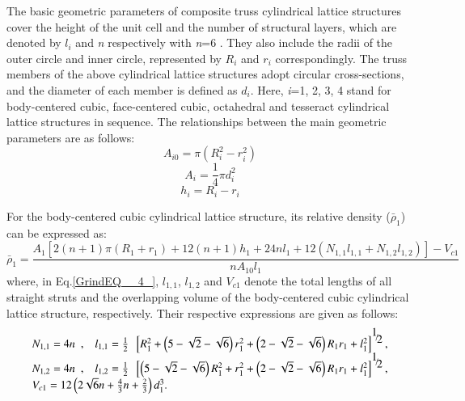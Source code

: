 \documentclass{article} %
\begin{document}
The basic geometric parameters of composite truss cylindrical lattice structures cover the height of the unit cell and the number of structural layers, which are denoted by $l_{i} $ and \textit{n} respectively with \textit{n}=6 . They also include the radii of the outer circle and inner circle, represented by $R_{i} $ and $r_{i} $ correspondingly. The truss members of the above cylindrical lattice structures adopt circular cross-sections, and the diameter of each member is defined as $d_{i} $. Here, \textit{i}=1, 2, 3, 4 stand for body-centered cubic, face-centered cubic, octahedral and tesseract cylindrical lattice structures in sequence. The relationships between the main geometric parameters are as follows:
\begin{equation} \label{GrindEQ__1_} 
A_{i0} =\pi \left(R_{i}^{2} -r_{i}^{2} \right) 
\end{equation} 
\begin{equation} \label{GrindEQ__2_} 
A_{i} =\frac{1}{4} \pi d_{i}^{2}  
\end{equation} 
\begin{equation} \label{GrindEQ__3_} 
h_{i} =R_{i} -r_{i}  
\end{equation} 

For the body-centered cubic cylindrical lattice structure, its relative density ($\bar{\rho }_{1} $) can be expressed as:
\begin{equation} \label{GrindEQ__4_} 
\bar{\rho }_{1} =\frac{A_{1} \left[2\left(n+1\right)\pi \left(R_{1} +r_{1} \right)+12\left(n+1\right)h_{1} +24nl_{1} +12\left(N_{1,1} l_{1,1} +N_{1,2} l_{1,2} \right)\right]-V_{c1} }{nA_{10} l_{1} }  
\end{equation} 
where, in Eq.\eqref{GrindEQ__4_}, $l_{1,1} $, $l_{1,2} $ and $V_{c1} $ denote the total lengths of all straight struts and the overlapping volume of the body-centered cubic cylindrical lattice structure, respectively. Their respective expressions are given as follows:
\[\begin{array}{l} {N_{1,1} =4n\begin{array}{cc} {,} & {l_{1,1} =\frac{1}{2} } \end{array}\left[R_{1}^{2} +\left(5-\sqrt{2} -\sqrt{6} \right)r_{1}^{2} +\left(2-\sqrt{2} -\sqrt{6} \right)R_{1} r_{1} +l_{1}^{2} \right]^{{\raise0.7ex\hbox{$ 1 $}\!\mathord{\left/{\vphantom{1 2}}\right.\kern-\nulldelimiterspace}\!\lower0.7ex\hbox{$ 2 $}} } ,} \\ {N_{1,2} =4n\begin{array}{cc} {,} & {l_{1,2} =\frac{1}{2} } \end{array}\left[\left(5-\sqrt{2} -\sqrt{6} \right)R_{1}^{2} +r_{1}^{2} +\left(2-\sqrt{2} -\sqrt{6} \right)R_{1} r_{1} +l_{1}^{2} \right]^{{\raise0.7ex\hbox{$ 1 $}\!\mathord{\left/{\vphantom{1 2}}\right.\kern-\nulldelimiterspace}\!\lower0.7ex\hbox{$ 2 $}} } ,} \\ {V_{c1} =12\left(2\sqrt{6} n+\frac{4}{3} n+\frac{2}{3} \right)d_{1}^{3} .} \end{array}\] 
\end{document}
